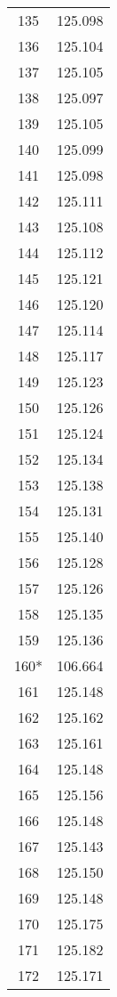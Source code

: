 \begin{multicols}{3}
\begin{table}[H]
\begin{tabular}{|c|c|}
            135 & 125.098 \\
            136 & 125.104 \\
            137 & 125.105 \\
            138 & 125.097 \\
            139 & 125.105 \\
            140 & 125.099 \\
            141 & 125.098 \\
            142 & 125.111 \\
            143 & 125.108 \\
            144 & 125.112 \\
            145 & 125.121 \\
            146 & 125.120 \\
            147 & 125.114 \\
            148 & 125.117 \\
            149 & 125.123 \\
            150 & 125.126 \\
            151 & 125.124 \\
            152 & 125.134 \\
            153 & 125.138 \\
            154 & 125.131 \\
            155 & 125.140 \\
            156 & 125.128 \\
            157 & 125.126 \\
            158 & 125.135 \\
            159 & 125.136 \\
            160* & 106.664 \\
            161 & 125.148 \\
            162 & 125.162 \\
            163 & 125.161 \\
            164 & 125.148 \\
            165 & 125.156 \\
            166 & 125.148 \\
            167 & 125.143 \\
            168 & 125.150 \\
            169 & 125.148 \\
            170 & 125.175 \\
            171 & 125.182 \\
            172 & 125.171 \\

\end{tabular}
\end{table}
\end{multicols}
